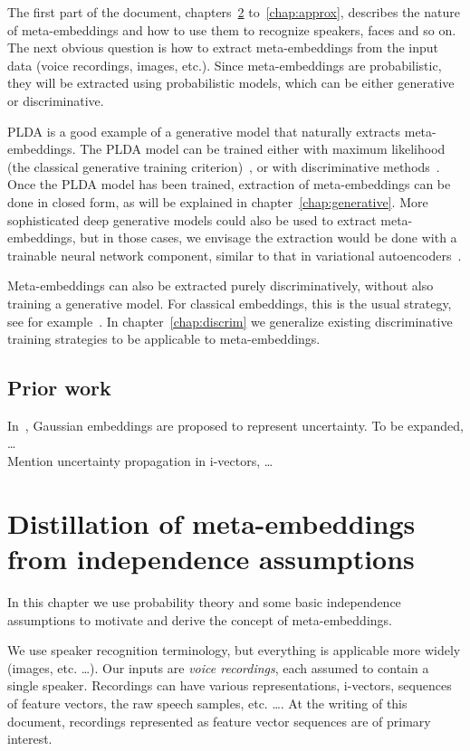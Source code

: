 \documentclass[a4paper,oneside,12pt,english]{report}
\begin{document}
The first part of the document, chapters~\ref{chap:fp} to~\ref{chap:approx}, describes the nature of meta-embeddings and how to use them to recognize speakers, faces and so on. The next obvious question is how to extract meta-embeddings from the input data (voice recordings, images, etc.). Since meta-embeddings are probabilistic, they will be extracted using probabilistic models, which can be either generative or discriminative. 

PLDA is a good example of a generative model that naturally extracts meta-embeddings. The PLDA model can be trained either with maximum likelihood (the classical generative training criterion)~\cite{ht-plda,SPP}, or with discriminative methods~\cite{Sandro_pairs,Sandro_PSVM}. Once the PLDA model has been trained, extraction of meta-embeddings can be done in closed form, as will be explained in chapter~\ref{chap:generative}. More sophisticated deep generative models could also be used to extract meta-embeddings, but in those cases, we envisage the extraction would be done with a trainable neural network component, similar to that in variational autoencoders~\cite{VAE}.

Meta-embeddings can also be extracted purely discriminatively, without also training a generative model. For classical embeddings, this is the usual strategy, see for example~\cite{Facenet,end2end,DSIS17,Voxceleb,LIMSI_Language_embedding}. In chapter~\ref{chap:discrim} we generalize existing discriminative training strategies to be applicable to meta-embeddings. 


\section{Prior work}
In~\cite{Vilnis}, Gaussian embeddings are proposed to represent uncertainty. To be expanded, \ldots\\

\noindent Mention uncertainty propagation in i-vectors\cite{Uncertainty-Sandro, Uncertainty-Patrick, Uncertainty-Themos, Uncertainty-Bilbao}, \ldots 

\chapter{Distillation of meta-embeddings from independence assumptions}
\label{chap:fp}
In this chapter we use probability theory and some basic independence assumptions to motivate and derive the concept of meta-embeddings.  

We use speaker recognition terminology, but everything is applicable more widely (images, etc. \ldots). Our inputs are \emph{voice recordings}, each assumed to contain a single speaker. Recordings can have various representations, i-vectors, sequences of feature vectors, the raw speech samples, etc. \ldots. At the writing of this document, recordings represented as feature vector sequences are of primary interest.  
\end{document}
